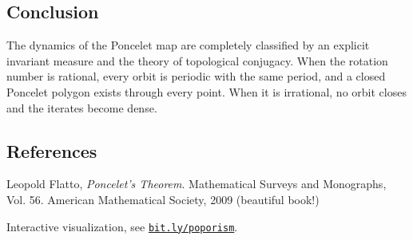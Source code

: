 \begin{technical}
\subsection*{Conclusion}

The dynamics of the Poncelet map are completely classified by an explicit invariant measure and the theory of topological conjugacy. When the rotation number is rational, every orbit is periodic with the same period, and a closed Poncelet polygon exists through every point. When it is irrational, no orbit closes and the iterates become dense. 

\subsection*{References}
Leopold Flatto, \textit{Poncelet’s Theorem}. Mathematical Surveys and Monographs, Vol. 56. American Mathematical Society, 2009 (beautiful book!)

Interactive visualization, see \href{https://bit.ly/poporism}{\texttt{bit.ly/poporism}}.
\end{technical}
